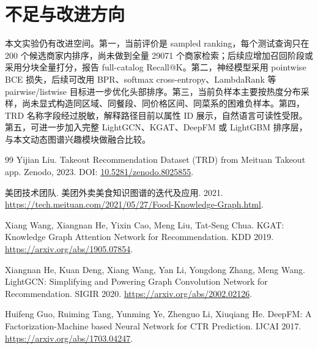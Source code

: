 \documentclass[UTF8,a4paper,12pt]{ctexart}
\begin{document}
\section{不足与改进方向}

本文实验仍有改进空间。第一，当前评价是 sampled ranking，每个测试查询只在 200 个候选商家内排序，尚未做到全量 29071 个商家检索；后续应增加召回阶段或采用分块全量打分，报告 full-catalog Recall@K。第二，神经模型采用 pointwise BCE 损失，后续可改用 BPR、softmax cross-entropy、LambdaRank 等 pairwise/listwise 目标进一步优化头部排序。第三，当前负样本主要按热度分布采样，尚未显式构造同区域、同餐段、同价格区间、同菜系的困难负样本。第四，TRD 名称字段经过脱敏，解释路径目前以属性 ID 展示，自然语言可读性受限。第五，可进一步加入完整 LightGCN、KGAT、DeepFM 或 LightGBM 排序层，与本文动态图谱兴趣模块做融合比较。

\begin{thebibliography}{99}
Yijian Liu. Takeout Recommendation Dataset (TRD) from Meituan Takeout app. Zenodo, 2023. DOI: \href{https://doi.org/10.5281/zenodo.8025855}{10.5281/zenodo.8025855}.

美团技术团队. 美团外卖美食知识图谱的迭代及应用. 2021. \url{https://tech.meituan.com/2021/05/27/Food-Knowledge-Graph.html}.

Xiang Wang, Xiangnan He, Yixin Cao, Meng Liu, Tat-Seng Chua. KGAT: Knowledge Graph Attention Network for Recommendation. KDD 2019. \url{https://arxiv.org/abs/1905.07854}.

Xiangnan He, Kuan Deng, Xiang Wang, Yan Li, Yongdong Zhang, Meng Wang. LightGCN: Simplifying and Powering Graph Convolution Network for Recommendation. SIGIR 2020. \url{https://arxiv.org/abs/2002.02126}.

Huifeng Guo, Ruiming Tang, Yunming Ye, Zhenguo Li, Xiuqiang He. DeepFM: A Factorization-Machine based Neural Network for CTR Prediction. IJCAI 2017. \url{https://arxiv.org/abs/1703.04247}.
\end{thebibliography}
\end{document}
